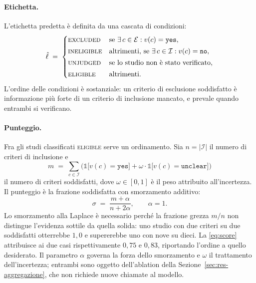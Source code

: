 \documentclass[pdflatex,sn-mathphys-num]{sn-jnl}
\theoremstyle{thmstyleone}
\theoremstyle{thmstyletwo}
\theoremstyle{thmstylethree}
\begin{document}
\paragraph{Etichetta.} L'etichetta predetta è definita da una cascata di condizioni:
\begin{equation}
  \hat{\ell} \;=\;
  \begin{cases}
    \textsc{excluded}    & \text{se } \exists\, c \in \mathcal{E} : v(c) = \texttt{yes},\\[2pt]
    \textsc{ineligible}  & \text{altrimenti, se } \exists\, c \in \mathcal{I} : v(c) = \texttt{no},\\[2pt]
    \textsc{unjudged}    & \text{se lo studio non è stato verificato,}\\[2pt]
    \textsc{eligible}    & \text{altrimenti.}
  \end{cases}
  \label{eq:etichetta}
\end{equation}
L'ordine delle condizioni è sostanziale: un criterio di esclusione soddisfatto è informazione più forte di un criterio di inclusione mancato, e prevale quando entrambi si verificano.

\paragraph{Punteggio.} Fra gli studi classificati \textsc{eligible} serve un ordinamento. Sia $n = |\mathcal{I}|$ il numero di criteri di inclusione e
\begin{equation}
  m \;=\; \sum_{c \in \mathcal{I}} \Big( \mathds{1}\big[v(c) = \texttt{yes}\big] + \omega \cdot \mathds{1}\big[v(c) = \texttt{unclear}\big] \Big)
  \label{eq:soddisfatti}
\end{equation}
il numero di criteri soddisfatti, dove $\omega \in [0,1]$ è il peso attribuito all'incertezza. Il punteggio è la frazione soddisfatta con smorzamento additivo:
\begin{equation}
  \sigma \;=\; \frac{m + \alpha}{n + 2\alpha}, \qquad \alpha = 1.
  \label{eq:score}
\end{equation}
Lo smorzamento alla Laplace è necessario perché la frazione grezza $m/n$ non distingue l'evidenza sottile da quella solida: uno studio con due criteri su due soddisfatti otterrebbe $1{,}0$ e supererebbe uno con nove su dieci. La \eqref{eq:score} attribuisce ai due casi rispettivamente $0{,}75$ e $0{,}83$, riportando l'ordine a quello desiderato. Il parametro $\alpha$ governa la forza dello smorzamento e $\omega$ il trattamento dell'incertezza; entrambi sono oggetto dell'ablation della Sezione~\ref{sec:res-aggregazione}, che non richiede nuove chiamate al modello.
\end{document}
